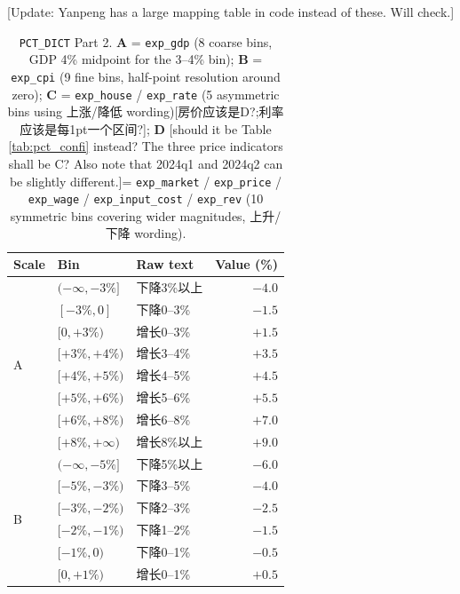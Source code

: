 \documentclass[11pt,letterpaper,english,final]{article}
\begin{document}
\begin{table}[H]
\centering
\small
\setlength{\tabcolsep}{6pt}
\caption{\texttt{PCT\_DICT} Part 2. \textbf{A} = \texttt{exp\_gdp} (8 coarse bins, GDP 4\% midpoint for the 3--4\% bin); \textbf{B} = \texttt{exp\_cpi} (9 fine bins, half-point resolution around zero); \textbf{C} = \texttt{exp\_house} / \texttt{exp\_rate} (5 asymmetric bins using 上涨/降低 wording){\color{cyan}[房价应该是D?;利率应该是每1pt一个区间?]}; \textbf{D} {\color{cyan}[should it be Table \ref{tab:pct_confi} instead? The three price indicators shall be C? Also note that 2024q1 and 2024q2 can be slightly different.]}= \texttt{exp\_market} / \texttt{exp\_price} / \texttt{exp\_wage} / \texttt{exp\_input\_cost} / \texttt{exp\_rev} (10 symmetric bins covering wider magnitudes, 上升/下降 wording).} {\color{cyan}[Update: Yanpeng has a large mapping table in code instead of these. Will check.]}
\label{tab:pct_qspec}
\begin{tabular}{@{}l l l r@{}}
\toprule
{Scale} & {Bin} & {Raw text} & {Value (\%)} \\
\midrule
\multirow{8}{*}{A} & $(-\infty,-3\%]$   & 下降3\%以上      & $-4.0$ \\
                   & $[-3\%,0]$         & 下降0--3\%       & $-1.5$ \\
                   & $[0,+3\%)$         & 增长0--3\%       & $+1.5$ \\
                   & $[+3\%,+4\%)$      & 增长3--4\%       & $+3.5$ \\
                   & $[+4\%,+5\%)$      & 增长4--5\%       & $+4.5$ \\
                   & $[+5\%,+6\%)$      & 增长5--6\%       & $+5.5$ \\
                   & $[+6\%,+8\%)$      & 增长6--8\%       & $+7.0$ \\
                   & $[+8\%,+\infty)$   & 增长8\%以上      & $+9.0$ \\
\midrule
\multirow{9}{*}{B} & $(-\infty,-5\%]$   & 下降5\%以上      & $-6.0$ \\
                   & $[-5\%,-3\%)$      & 下降3--5\%       & $-4.0$ \\
                   & $[-3\%,-2\%)$      & 下降2--3\%       & $-2.5$ \\
                   & $[-2\%,-1\%)$      & 下降1--2\%       & $-1.5$ \\
                   & $[-1\%,0)$         & 下降0--1\%       & $-0.5$ \\
                   & $[0,+1\%)$         & 增长0--1\%       & $+0.5$ \\

\end{tabular}
\end{table}
\end{document}
